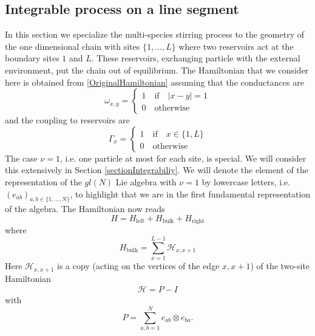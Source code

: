 \documentclass[10pt]{article}
\numberwithin{equation}{section}
\numberwithin{equation}{subsection}
\newcommand{\id}{I}
\begin{document}
\subsection{Integrable process on a line segment}\label{subsection-description-process-LINE}
In this section we specialize the multi-species stirring process to the geometry of the one dimensional chain with sites $\{1,\ldots,L\}$ where two reservoirs act at the boundary sites $1$ and $L$. These reservoirs, exchanging particle with the external environment, put the chain out of equilibrium. The Hamiltonian that we consider here is obtained from \eqref{OriginalHamiltonian} assuming that the conductances are
\begin{equation}
	\omega_{x,y}=\begin{cases}
		1 \quad \text{if}\quad |x-y|=1\\
		0\quad \text{otherwise}
	\end{cases}
\end{equation}
and the coupling to reservoirs are
\begin{equation}
	\Gamma_{x}=\begin{cases}
		1\quad \text{if} \quad x\in \{1,L\}\\
		0\quad \text{otherwise}
	\end{cases}
\end{equation}
The case $\nu=1$, i.e. one particle at most for each site, is special. We will consider this extensively in Section \ref{sectionIntegrabiliy}.
We will denote the element of the representation of the $gl(N)$  Lie algebra with $\nu=1$ by lowercase letters, i.e. $(e_{ab})_{a,b\in\{1,\ldots,N\}}$, to highlight that we are in the first fundamental representation of the algebra.
The Hamiltonian now reads
\begin{equation}\label{hamiltonian}
	H=H_{\text{left}}+H_{\text{bulk}}+H_{\text{right}}
\end{equation}
where
\begin{equation}
	H_{\text{bulk}}=\sum_{x=1}^{L-1}\mathcal{H}_{x,x+1}
\end{equation}
Here $\mathcal{H}_{x,x+1}$  is a copy (acting on the vertices of the edge $x,x+1$) of the two-site Hamiltonian
\begin{equation}\label{H-corsivo}
	\begin{split}
		\mathcal{H}=P-\id
	\end{split}
\end{equation}
with 
\begin{equation}
	P=\sum_{a,b=1}^Ne_{ab}\otimes e_{ba}.
\end{equation} 
\end{document}
